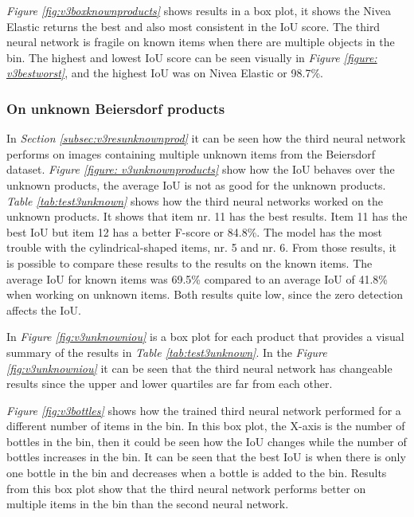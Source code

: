 \textit{Figure \ref{fig:v3boxknownproducts}} shows results in a box plot, it shows the Nivea Elastic returns the best and also most consistent in the IoU score. The third neural network is fragile on known items when there are multiple objects in the bin. The highest and lowest IoU score can be seen visually in \textit{Figure \ref{figure: v3bestworst}}, and the highest IoU was on Nivea Elastic or 98.7\%. 

\subsubsection{On unknown Beiersdorf products}
In \textit{Section \ref{subsec:v3resunknownprod}} it can be seen how the third neural network performs on images containing multiple unknown items from the Beiersdorf dataset. \textit{Figure \ref{figure: v3unknownproducts}} show how the IoU behaves over the unknown products, the average IoU is not as good for the unknown products. 
\textit{Table \ref{tab:test3unknown}} shows how the third neural networks worked on the unknown products. It shows that item nr. 11 has the best results. Item 11 has the best IoU but item 12 has a better F-score or 84.8\%. The model has the most trouble with the cylindrical-shaped items, nr. 5 and nr. 6. From those results, it is possible to compare these results to the results on the known items. The average IoU for known items was 69.5\% compared to an average IoU of 41.8\% when working on unknown items. Both results quite low, since the zero detection affects the IoU.



In \textit{Figure \ref{fig:v3unknowniou}} is a box plot for each product that provides a visual summary of the results in \textit{Table \ref{tab:test3unknown}}. In the \textit{Figure \ref{fig:v3unknowniou}} it can be seen that the third neural network has changeable results since the upper and lower quartiles are far from each other.



\textit{Figure \ref{fig:v3bottles}} shows how the trained third neural network performed for a different number of items in the bin. In this box plot, the X-axis is the number of bottles in the bin, then it could be seen how the IoU changes while the number of bottles increases in the bin. It can be seen that the best IoU is when there is only one bottle in the bin and decreases when a bottle is added to the bin. Results from this box plot show that the third neural network performs better on multiple items in the bin than the second neural network.

